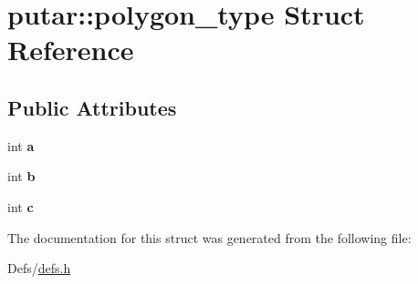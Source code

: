 \hypertarget{structputar_1_1polygon__type}{}\section{putar\+:\+:polygon\+\_\+type Struct Reference}
\label{structputar_1_1polygon__type}
\subsection*{Public Attributes}
\begin{DoxyCompactItemize}
\item 
int {\bfseries a}\hypertarget{structputar_1_1polygon__type_ad21068ccb1eca6617cee793aa1f36616}{}\label{structputar_1_1polygon__type_ad21068ccb1eca6617cee793aa1f36616}

\item 
int {\bfseries b}\hypertarget{structputar_1_1polygon__type_a2900f8cfa5c7d03a811258756a2823a8}{}\label{structputar_1_1polygon__type_a2900f8cfa5c7d03a811258756a2823a8}

\item 
int {\bfseries c}\hypertarget{structputar_1_1polygon__type_aaff91e2352ece59b590e3cbdddc1a1df}{}\label{structputar_1_1polygon__type_aaff91e2352ece59b590e3cbdddc1a1df}

\end{DoxyCompactItemize}


The documentation for this struct was generated from the following file\+:\begin{DoxyCompactItemize}
\item 
Defs/\hyperlink{defs_8h}{defs.\+h}\end{DoxyCompactItemize}
